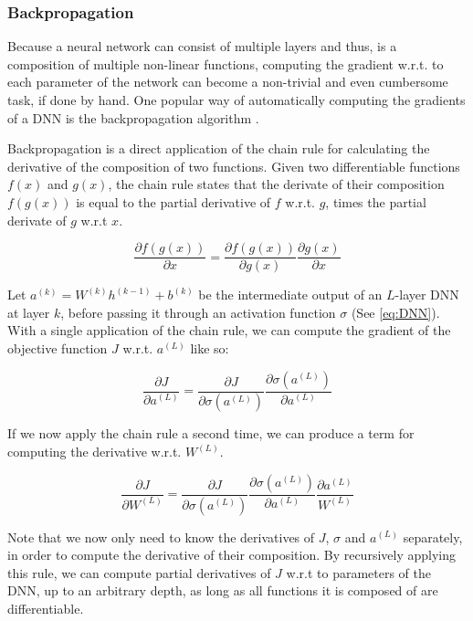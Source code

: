 \subsubsection{Backpropagation}
\label{sec:backprop}
Because a neural network can consist of multiple layers and thus, is a composition of multiple non-linear functions, computing the gradient w.r.t. to each parameter of the network can become a non-trivial and even cumbersome task, if done by hand. One popular way of automatically computing the gradients of a DNN is the backpropagation algorithm \cite{rumelhart1988learning}.

Backpropagation is a direct application of the chain rule for calculating the derivative of the composition of two functions. Given two differentiable functions $f(x)$ and $g(x)$, the chain rule states that the derivate of their composition $f(g(x))$ is equal to the partial derivative of $f$ w.r.t. $g$, times the partial derivate of $g$ w.r.t $x$.

\begin{equation}
    \frac{\partial f(g(x))}{\partial x} = \frac{\partial f(g(x))}{\partial g(x)} \frac{\partial g(x)}{\partial x}
\end{equation}

Let $a^{(k)} = W^{(k)} h^{(k-1)} + b^{(k)}$ be the intermediate output of an $L$-layer DNN at layer $k$, before passing it through an activation function $\sigma$ (See \ref{eq:DNN}). With a single application of the chain rule, we can compute the gradient of the objective function $J$ w.r.t. $a^{(L)}$ like so:

\begin{equation}
    \frac{\partial J}{\partial a^{(L)}} = \frac{\partial J}{\partial \sigma(a^{(L)})} \frac{\partial \sigma(a^{(L)})}{\partial a^{(L)}}
\end{equation}

If we now apply the chain rule a second time, we can produce a term for computing the derivative w.r.t. $W^{(L)}$.

\begin{equation}
    \frac{\partial J}{\partial W^{(L)}} = \frac{\partial J}{\partial \sigma(a^{(L)})} \frac{\partial \sigma(a^{(L)})}{\partial a^{(L)}} \frac{\partial a^{(L)}}{W^{(L)}}
\end{equation}

Note that we now only need to know the derivatives of $J$, $\sigma$ and $a^{(L)}$ separately, in order to compute the derivative of their composition. By recursively applying this rule, we can compute partial derivatives of $J$ w.r.t to parameters of the DNN, up to an arbitrary depth, as long as all functions it is composed of are differentiable.

